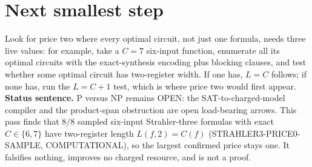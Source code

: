 \documentclass[11pt]{article}
\begin{document}
\section*{Next smallest step}
Look for price two where every optimal circuit, not just one formula, needs three live values: for example, take a $C=7$ six-input function, enumerate all its optimal circuits with the exact-synthesis encoding plus blocking clauses, and test whether some optimal circuit has two-register width. If one has, $L=C$ follows; if none has, run the $L=C+1$ test, which is where price two would first appear.
\bigskip
\noindent\textbf{Status sentence.} P versus NP remains OPEN: the SAT-to-charged-model compiler and the product-span obstruction are open load-bearing arrows. This pass finds that $8/8$ sampled six-input Strahler-three formulas with exact $C\in\{6,7\}$ have two-register length $L(f,2)=C(f)$ (STRAHLER3-PRICE0-SAMPLE, COMPUTATIONAL), so the largest confirmed price stays one. It falsifies nothing, improves no charged resource, and is not a proof.
\end{document}
